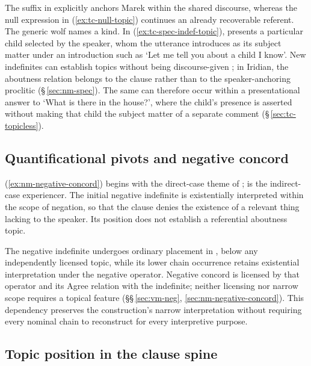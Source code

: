 \noindent The suffix in  explicitly anchors Marek within the shared
 discourse, whereas the null expression in (\ref{ex:tc-null-topic}) continues
 an already recoverable referent. The generic wolf names a kind. In
 (\ref{ex:tc-spec-indef-topic}),  presents a particular child selected
 by the speaker, whom the utterance introduces as its subject matter under
 an introduction such as `Let me tell you about a child I know'. New
 indefinites can establish topics without being discourse-given
 \cite[§\,5.1]{krifka2008}; in Iridian, the aboutness relation belongs to
 the clause rather than to the speaker-anchoring proclitic
 (§\,\ref{sec:nm-spec}). The same  can therefore occur within
 a presentational answer to `What is there in the house?', where the child's
 presence is asserted without making that child the subject matter of a
 separate comment
 (§\,\ref{sec:tc-topicless}).

\subsection{Quantificational pivots and negative concord}
\label{sec:tc-quantificational-pivots}

 
 (\ref{ex:nm-negative-concord}) begins with the direct-case theme of
  ;  is the indirect-case experiencer.
 The initial negative indefinite is existentially interpreted within the scope
 of negation, so that the clause denies the existence of a relevant thing
 lacking to the speaker. Its position does not establish a referential
 aboutness topic.

The negative indefinite undergoes ordinary placement in ,
 below any independently licensed topic, while its lower chain occurrence
 retains existential interpretation under the negative operator. Negative
 concord is licensed by that operator and its Agree relation with the
 indefinite; neither licensing nor narrow scope requires a topical feature
 (§§\,\ref{sec:vm-neg}, \ref{sec:nm-negative-concord}). This dependency
 preserves the construction's narrow interpretation without requiring every
 nominal chain to reconstruct for every interpretive purpose.

\subsection{Topic position in the clause spine}
\label{sec:tc-clause-spine}

